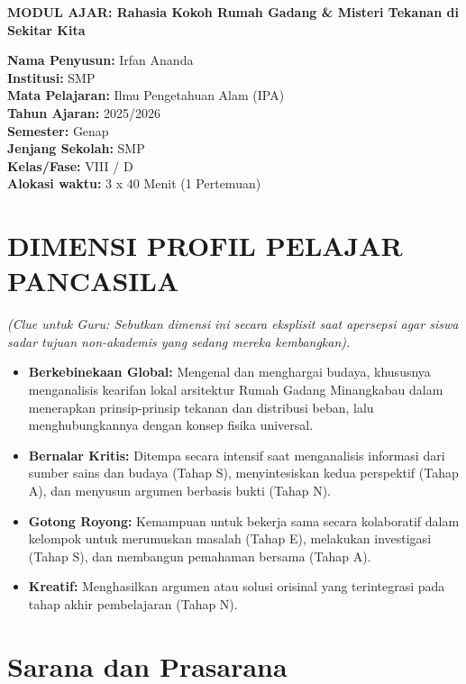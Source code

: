 \documentclass[12pt,a4paper]{article}
\begin{document}
\begin{center}
\textbf{\Large MODUL AJAR: Rahasia Kokoh Rumah Gadang \& Misteri Tekanan di Sekitar Kita}
\end{center}

\vspace{0.5cm}

\begin{tcolorbox}[mystyle]
\textbf{Nama Penyusun:} Irfan Ananda \\
\textbf{Institusi:} SMP \\
\textbf{Mata Pelajaran:} Ilmu Pengetahuan Alam (IPA) \\
\textbf{Tahun Ajaran:} 2025/2026 \\
\textbf{Semester:} Genap \\
\textbf{Jenjang Sekolah:} SMP \\
\textbf{Kelas/Fase:} VIII / D \\
\textbf{Alokasi waktu:} 3 x 40 Menit (1 Pertemuan)
\end{tcolorbox}

\section{DIMENSI PROFIL PELAJAR PANCASILA}
\textit{(Clue untuk Guru: Sebutkan dimensi ini secara eksplisit saat apersepsi agar siswa sadar tujuan non-akademis yang sedang mereka kembangkan).}

\begin{itemize}
\item \textbf{Berkebinekaan Global:} Mengenal dan menghargai budaya, khususnya menganalisis kearifan lokal arsitektur Rumah Gadang Minangkabau dalam menerapkan prinsip-prinsip tekanan dan distribusi beban, lalu menghubungkannya dengan konsep fisika universal.
\item \textbf{Bernalar Kritis:} Ditempa secara intensif saat menganalisis informasi dari sumber sains dan budaya (Tahap S), menyintesiskan kedua perspektif (Tahap A), dan menyusun argumen berbasis bukti (Tahap N).
\item \textbf{Gotong Royong:} Kemampuan untuk bekerja sama secara kolaboratif dalam kelompok untuk merumuskan masalah (Tahap E), melakukan investigasi (Tahap S), dan membangun pemahaman bersama (Tahap A).
\item \textbf{Kreatif:} Menghasilkan argumen atau solusi orisinal yang terintegrasi pada tahap akhir pembelajaran (Tahap N).
\end{itemize}

\section{Sarana dan Prasarana}
\end{document}
